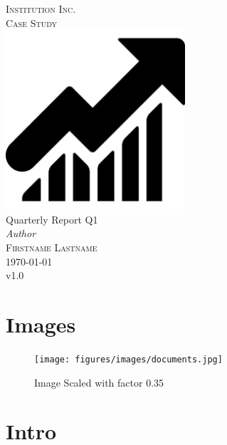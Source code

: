 \documentclass[a4paper, 12pt]{report}
\newcommand{\varDocTitle}{Quarterly Report Q1}
\newcommand{\varDocAuthor}{Firstname Lastname}
\newcommand{\varInstitution}{Institution Inc.}
\newcommand{\varReportType}{Case Study}
\begin{document}
    \begin{titlepage}
        \newcommand{\HRule}{\rule{\linewidth}{0.3mm}}
        \center
        \textsc{\large \varInstitution}\\[1.5cm]
        \textsc{\large \varReportType}\\[1.5cm]
        \includegraphics[width=0.5\textwidth]{figures/images/logo.png}\\[1.5cm]
        {\huge \varDocTitle }\\[2cm]
        {\large\textit{Author}}\\
        \textsc{\varDocAuthor}\\[1cm]
        {\large\today\\v1.0}
    \end{titlepage}

    \tableofcontents

    \printglossary
    \printglossary[type=\acronymtype, title=Begriffe und Abkürzungen, toctitle=Begriffe und Abkürzungen]
    
    \listoftables %
    \listoffigures %

    \chapter{Images}

    \begin{figure}[!htb]
        \centering
        \texttt{[image: figures/images/documents.jpg]}
        \caption{Image Scaled with factor 0.35}
        \label{fig:mobileid-architecture}
    \end{figure}

    \chapter{Intro}
    
\end{document}
